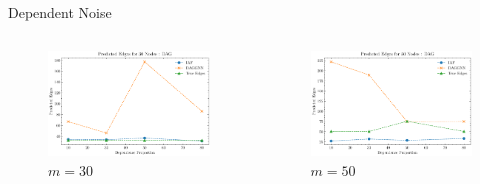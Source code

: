 \documentclass{beamer}
\begin{document}
\begin{frame}[allowframebreaks]{Dependent Noise}
\begin{columns}
    \end{columns}
    \begin{columns}
        \begin{column}{0.5\textwidth}
        \begin{figure}
            \centering
            \includegraphics[scale=0.3]{fig/Predicted Edges_dependence_30_DAG_threshold0.3.pdf}
            \caption{$m=30$}
            \label{fig:dep_gaussian_edges_30}
        \end{figure}
        \end{column}
        \begin{column}{0.5\textwidth}
        \begin{figure}
            \centering
            \includegraphics[scale=0.3]{fig/Predicted Edges_dependence_50_DAG_threshold0.3.pdf}
            \caption{$m=50$}
            \label{fig:dep_gaussian_edges_50}
        \end{figure}
        \end{column}
    \end{columns}    


\end{frame}
\end{document}
